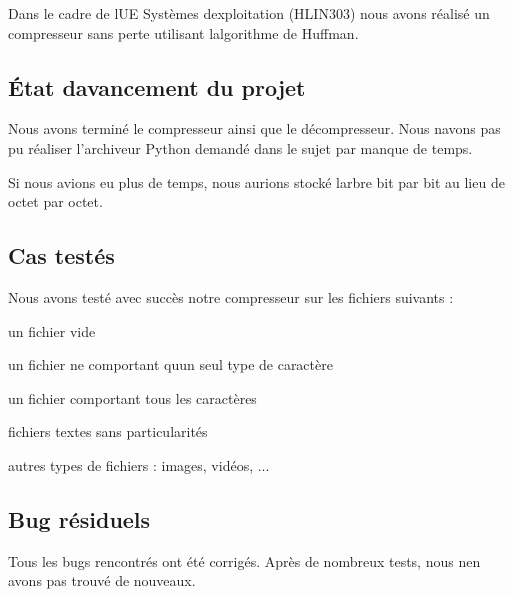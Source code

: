 Dans le cadre de l\textquotesingle{}UE Systèmes d\textquotesingle{}exploitation (H\+L\+I\+N303) nous avons réalisé un compresseur sans perte utilisant l\textquotesingle{}algorithme de Huffman.

\subsection*{État d\textquotesingle{}avancement du projet}

Nous avons terminé le compresseur ainsi que le décompresseur. Nous n\textquotesingle{}avons pas pu réaliser l’archiveur Python demandé dans le sujet par manque de temps.

Si nous avions eu plus de temps, nous aurions stocké l\textquotesingle{}arbre bit par bit au lieu de octet par octet.

\subsection*{Cas testés}

Nous avons testé avec succès notre compresseur sur les fichiers suivants \+:
\begin{DoxyItemize}
\item un fichier vide
\item un fichier ne comportant qu\textquotesingle{}un seul type de caractère
\item un fichier comportant tous les caractères
\item fichiers textes sans particularités
\item autres types de fichiers \+: images, vidéos, ...
\end{DoxyItemize}

\subsection*{Bug résiduels}

Tous les bugs rencontrés ont été corrigés. Après de nombreux tests, nous n\textquotesingle{}en avons pas trouvé de nouveaux. 
